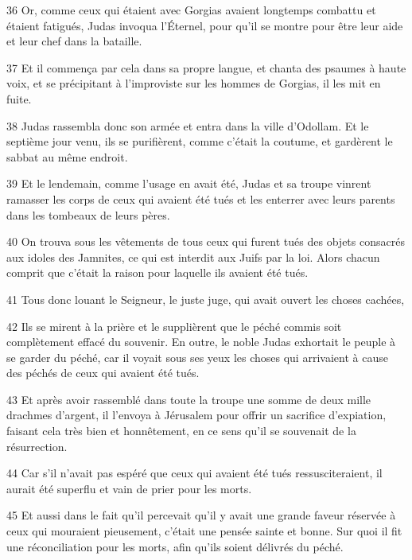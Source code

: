 \par 36 Or, comme ceux qui étaient avec Gorgias avaient longtemps combattu et étaient fatigués, Judas invoqua l'Éternel, pour qu'il se montre pour être leur aide et leur chef dans la bataille.
\par 37 Et il commença par cela dans sa propre langue, et chanta des psaumes à haute voix, et se précipitant à l'improviste sur les hommes de Gorgias, il les mit en fuite.
\par 38 Judas rassembla donc son armée et entra dans la ville d'Odollam. Et le septième jour venu, ils se purifièrent, comme c'était la coutume, et gardèrent le sabbat au même endroit.
\par 39 Et le lendemain, comme l'usage en avait été, Judas et sa troupe vinrent ramasser les corps de ceux qui avaient été tués et les enterrer avec leurs parents dans les tombeaux de leurs pères.
\par 40 On trouva sous les vêtements de tous ceux qui furent tués des objets consacrés aux idoles des Jamnites, ce qui est interdit aux Juifs par la loi. Alors chacun comprit que c'était la raison pour laquelle ils avaient été tués.
\par 41 Tous donc louant le Seigneur, le juste juge, qui avait ouvert les choses cachées,
\par 42 Ils se mirent à la prière et le supplièrent que le péché commis soit complètement effacé du souvenir. En outre, le noble Judas exhortait le peuple à se garder du péché, car il voyait sous ses yeux les choses qui arrivaient à cause des péchés de ceux qui avaient été tués.
\par 43 Et après avoir rassemblé dans toute la troupe une somme de deux mille drachmes d'argent, il l'envoya à Jérusalem pour offrir un sacrifice d'expiation, faisant cela très bien et honnêtement, en ce sens qu'il se souvenait de la résurrection.
\par 44 Car s'il n'avait pas espéré que ceux qui avaient été tués ressusciteraient, il aurait été superflu et vain de prier pour les morts.
\par 45 Et aussi dans le fait qu'il percevait qu'il y avait une grande faveur réservée à ceux qui mouraient pieusement, c'était une pensée sainte et bonne. Sur quoi il fit une réconciliation pour les morts, afin qu'ils soient délivrés du péché.


